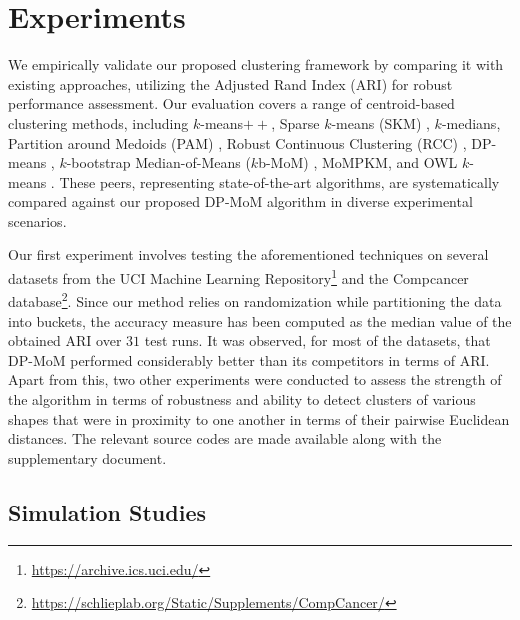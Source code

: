 \documentclass{article}
\begin{document}
\section{Experiments}
\label{sec:experiments}
We empirically validate our proposed clustering framework by comparing it with existing approaches, utilizing the Adjusted Rand Index (ARI) for robust performance assessment. Our evaluation covers a range of centroid-based clustering methods, including $k$-means$++$, Sparse $k$-means (SKM) \cite{SKM-paper}, $k$-medians, Partition around Medoids (PAM) \cite{PAM-paper}, Robust Continuous Clustering (RCC) \cite{Shah2017-jj}, DP-means \cite{DP-Means}, $k$-bootstrap Median-of-Means ($k$b-MoM) \cite{brunetsaumard2020kbmom}, MoMPKM, and OWL $k$-means \cite{pmlr-v206-chakraborty23a}. These peers, representing state-of-the-art algorithms, are systematically compared against our proposed DP-MoM algorithm in diverse experimental scenarios.

Our first experiment involves testing the aforementioned techniques on several datasets from the UCI Machine Learning Repository\footnote{\url{https://archive.ics.uci.edu/}} and the Compcancer database\footnote{\url{https://schlieplab.org/Static/Supplements/CompCancer/}}. Since our method relies on randomization while partitioning the data into buckets, the accuracy measure has been computed as the median value of the obtained ARI over $31$ test runs. It was observed, for most of the datasets, that DP-MoM performed considerably better than its competitors in terms of ARI. Apart from this, two other experiments were conducted to assess the strength of the algorithm in terms of robustness and ability to detect clusters of various shapes that were in proximity to one another in terms of their pairwise Euclidean distances. The relevant source codes are made available along with the supplementary document. 


\subsection{Simulation Studies}
\end{document}
